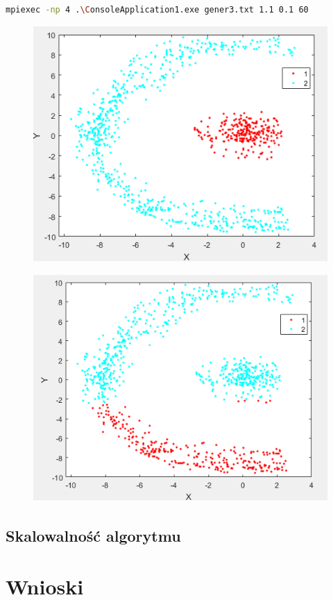 \documentclass[a4paper,10pt,table]{article}
\begin{document}
\begin{lstlisting}[language=BASH]
mpiexec -np 4 .\ConsoleApplication1.exe gener3.txt 1.1 0.1 60
\end{lstlisting}
\begin{figure}[h]
\centering
\begin{minipage}{.5\textwidth}
  \centering
  \includegraphics[width=.9\linewidth]{gener3nex.png}
  \label{fig:test1}
\end{minipage}%
\begin{minipage}{.5\textwidth}
  \centering
  \includegraphics[width=.9\linewidth]{gener3km.png}
  \label{fig:test2}
\end{minipage}
\end{figure}
\newpage
\subsection{Skalowalność algorytmu}
\newpage
\section{Wnioski}
\end{document}
